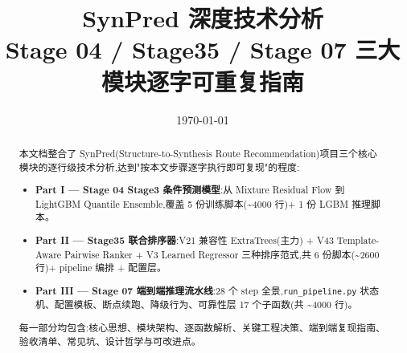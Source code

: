 \documentclass[11pt,a4paper]{article}
\title{\bfseries SynPred 深度技术分析\\
       \large{Stage 04 / Stage35 / Stage 07 三大模块逐字可重复指南}}
\author{}
\date{\today}
\newcommand{\file}[1]{\texttt{\small #1}}
\begin{document}
\maketitle

\begin{abstract}
本文档整合了 SynPred(Structure-to-Synthesis Route Recommendation)项目三个核心模块的逐行级技术分析,达到"按本文步骤逐字执行即可复现"的程度:

\begin{itemize}
    \item \textbf{Part I — Stage 04 Stage3 条件预测模型}:从 Mixture Residual Flow 到 LightGBM Quantile Ensemble,覆盖 5 份训练脚本(\textasciitilde 4000 行)+ 1 份 LGBM 推理脚本。
    \item \textbf{Part II — Stage35 联合排序器}:V21 兼容性 ExtraTrees(主力) + V43 Template-Aware Pairwise Ranker + V3 Learned Regressor 三种排序范式,共 6 份脚本(\textasciitilde 2600 行)+ pipeline 编排 + 配置层。
    \item \textbf{Part III — Stage 07 端到端推理流水线}:28 个 step 全景,\file{run\_pipeline.py} 状态机、配置模板、断点续跑、降级行为、可靠性层 17 个子函数(共 \textasciitilde 4000 行)。
\end{itemize}

每一部分均包含:核心思想、模块架构、逐函数解析、关键工程决策、端到端复现指南、验收清单、常见坑、设计哲学与可改进点。

\end{abstract}

\tableofcontents
\newpage


\newpage


\newpage


\end{document}
